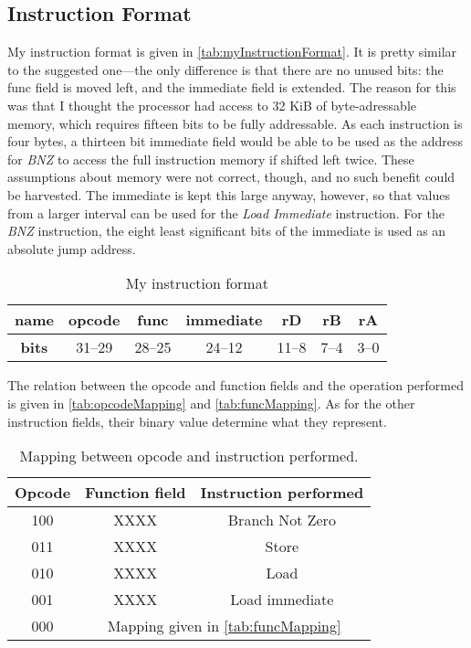 \documentclass[11pt]{article}
\begin{document}
\subsection{Instruction Format}
\label{subsec:instructionFormat}
My instruction format is given in
\autoref{tab:myInstructionFormat}. It is pretty similar to the
suggested one---the only difference is that there are no unused bits:
the func field is moved left, and the immediate field is extended. The
reason for this was that I thought the processor had access to 32 KiB
of byte-adressable memory, which requires fifteen bits to be fully
addressable. As each instruction is four bytes, a thirteen bit
immediate field would be able to be used as the address for {\em BNZ}
to access the full instruction memory if shifted left twice. These
assumptions about memory were not correct, though, and no such benefit
could be harvested. The immediate is kept this large anyway, however,
so that values from a larger interval can be used for the {\em Load
  Immediate} instruction. For the {\em BNZ} instruction, the eight
least significant bits of the immediate is used as an absolute jump
address.

\begin{table}[htbp]
  \centering
  \begin{tabular}{|c|c|c|c|c|c|c|}
    \hline
    {\bf name} & opcode & func & immediate & rD & rB & rA \\ \hline
    {\bf bits} & 31--29 & 28--25 & 24--12 & 11--8 & 7--4 & 3--0 \\ \hline
  \end{tabular}
  \caption{My instruction format}
  \label{tab:myInstructionFormat}
\end{table}

The relation between the opcode and function fields and the operation
performed is given in \autoref{tab:opcodeMapping} and
\autoref{tab:funcMapping}. As for the other instruction fields, their
binary value determine what they represent.

\begin{table}[htbp]
  \centering
  \begin{tabular}{|c|c|c|}
    \hline
    {\bf Opcode} & {\bf Function field} & {\bf Instruction performed} \\ \hline
    100 & XXXX & Branch Not Zero \\ \hline
    011 & XXXX & Store \\ \hline
    010 & XXXX & Load \\ \hline
    001 & XXXX & Load immediate \\ \hline
    000 & \multicolumn{2}{|c|}{Mapping given in \autoref{tab:funcMapping}} \\ \hline
  \end{tabular}
  \caption{Mapping between opcode and instruction performed.}
  \label{tab:opcodeMapping}
\end{table}
\end{document}
